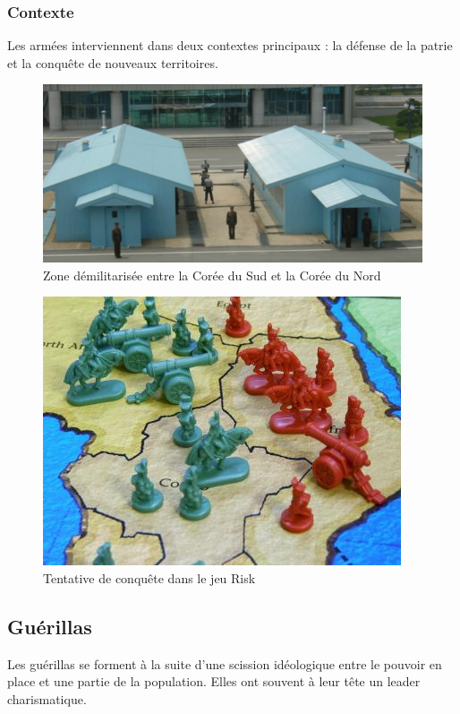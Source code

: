 \documentclass{article}
\begin{document}
\subsubsection{Contexte}
Les armées interviennent dans deux contextes principaux : la défense de la patrie et la conquête de nouveaux territoires.
\begin{figure}[H]
	\begin{centering}
	\includegraphics[width=\linewidth]{../ressources/dmz-corea}
	\caption{Zone démilitarisée entre la Corée du Sud et la Corée du Nord \cite{dmz_corea}}
	\end{centering}
\end{figure}
\begin{figure}[H]
	\begin{centering}
	\includegraphics[]{../ressources/risk-board-game}
	\caption{Tentative de conquête dans le jeu Risk \cite{risk_picture}}
	\end{centering}
\end{figure}




\subsection{Guérillas}
Les guérillas se forment à la suite d'une scission idéologique entre le pouvoir en place et une partie de la population. Elles ont souvent à leur tête un leader charismatique.
\end{document}

